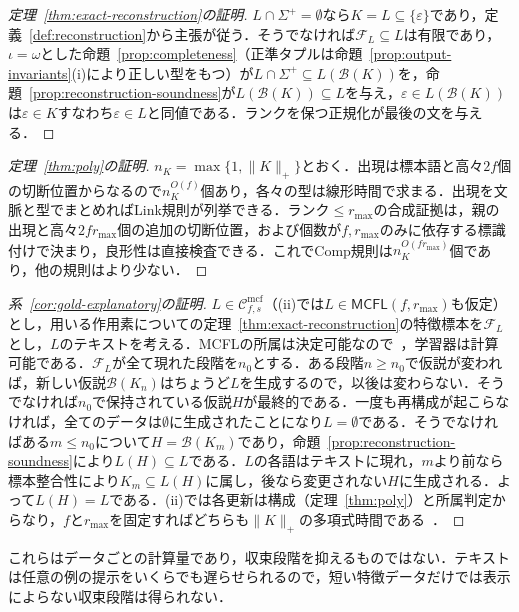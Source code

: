 \documentclass[11pt,a4paper]{ltjsarticle}
\numberwithin{equation}{section}
\theoremstyle{plain}
\theoremstyle{definition}
\theoremstyle{remark}
\newcommand{\Cmcf}[2]{\mathcal{C}^{\mathrm{mcf}}_{#1,#2}}
\newcommand{\eps}{\varepsilon}
\begin{document}
\begin{proof}[定理~\ref{thm:exact-reconstruction}の証明]
$L\cap\Sigma^+=\emptyset$なら$K=L\subseteq\{\eps\}$であり，定義~\ref{def:reconstruction}から主張が従う．そうでなければ$\mathcal F_L\subseteq L$は有限であり，$\iota=\omega$とした命題~\ref{prop:completeness}（正準タプルは命題~\ref{prop:output-invariants}(i)により正しい型をもつ）が$L\cap\Sigma^+\subseteq L(\mathcal B(K))$を，命題~\ref{prop:reconstruction-soundness}が$L(\mathcal B(K))\subseteq L$を与え，$\eps\in L(\mathcal B(K))$は$\eps\in K$すなわち$\eps\in L$と同値である．ランクを保つ正規化が最後の文を与える．
\end{proof}

\begin{proof}[定理~\ref{thm:poly}の証明]
$n_K=\max\{1,\|K\|_+\}$とおく．出現は標本語と高々$2f$個の切断位置からなるので$n_K^{O(f)}$個あり，各々の型は線形時間で求まる．出現を文脈と型でまとめればLink規則が列挙できる．ランク$\le r_{\max}$の合成証拠は，親の出現と高々$2fr_{\max}$個の追加の切断位置，および個数が$f,r_{\max}$のみに依存する標識付けで決まり，良形性は直接検査できる．これでComp規則は$n_K^{O(fr_{\max})}$個であり，他の規則はより少ない．
\end{proof}

\begin{proof}[系~\ref{cor:gold-explanatory}の証明]
$L\in\Cmcf{f}{s}$（(ii)では$L\in\mathsf{MCFL}(f,r_{\max})$も仮定）とし，用いる作用素についての定理~\ref{thm:exact-reconstruction}の特徴標本を$\mathcal F_L$とし，$L$のテキストを考える．MCFLの所属は決定可能なので~\cite{SekiEtAl1991}，学習器は計算可能である．$\mathcal F_L$が全て現れた段階を$n_0$とする．ある段階$n\ge n_0$で仮説が変われば，新しい仮説$\mathcal B(K_n)$はちょうど$L$を生成するので，以後は変わらない．そうでなければ$n_0$で保持されている仮説$H$が最終的である．一度も再構成が起こらなければ，全てのデータは$\emptyset$に生成されたことになり$L=\emptyset$である．そうでなければある$m\le n_0$について$H=\mathcal B(K_m)$であり，命題~\ref{prop:reconstruction-soundness}により$L(H)\subseteq L$である．$L$の各語はテキストに現れ，$m$より前なら標本整合性により$K_m\subseteq L(H)$に属し，後なら変更されない$H$に生成される．よって$L(H)=L$である．(ii)では各更新は構成（定理~\ref{thm:poly}）と所属判定からなり，$f$と$r_{\max}$を固定すればどちらも$\|K\|_+$の多項式時間である~\cite[Proposition~4]{Yoshinaka2011}．
\end{proof}

これらはデータごとの計算量であり，収束段階を抑えるものではない．テキストは任意の例の提示をいくらでも遅らせられるので，短い特徴データだけでは表示によらない収束段階は得られない．
\end{document}
